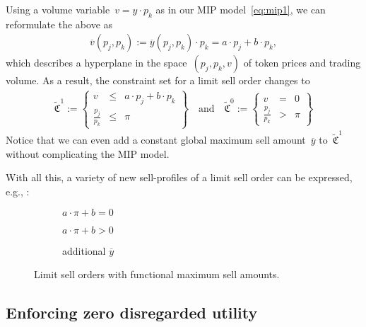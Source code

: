 \documentclass[11pt,parskip=full]{scrartcl}%
\newcommand*{\eg}{e.g., }
\begin{document}
Using a volume variable~$v = y \cdot p_k$ as in our MIP model~\eqref{eq:mip1}, we can reformulate
the above as
\begin{align}
  \overline{v}(p_j, p_k) := \overline{y}(p_j, p_k) \cdot p_k = a \cdot p_j + b \cdot p_k,
\end{align}
which describes a hyperplane in the space~$(p_j, p_k, v)$ of token prices and trading volume.
As a result, the constraint set for a limit sell order changes to
\begin{align}
  \tilde{\mathfrak{C}}^1 := \left\{
  \begin{array}{rlll}
    v &\le & a \cdot p_j + b \cdot p_k \\[1mm]
    \frac{p_j}{p_k} &\le & \pi
  \end{array}
  \right\}
  \quad
  \text{and}
  \quad
  \tilde{\mathfrak{C}}^0 := \left\{
  \begin{array}{rll}
    v &= & 0 \\[1mm]
    \frac{p_j}{p_k} &> & \pi
  \end{array}
  \right\}
  \label{eq:order_model_functional_sell_amount}
\end{align}
Notice that we can even add a constant global maximum sell amount~$\overline{y}$
to~$\tilde{\mathfrak{C}}^1$ without complicating the MIP model.

With all this, a variety of new sell-profiles of a limit sell order can be expressed, \eg:

\begin{figure}[h!]
  \begin{subfigure}{0.25\textwidth}
    
    \caption{$a \cdot \pi + b = 0$}
  \end{subfigure}
  \hfill
  \begin{subfigure}{0.25\textwidth}
    
    \caption{$a \cdot \pi + b > 0$}
  \end{subfigure}
  \hfill
  \begin{subfigure}{0.25\textwidth}
    
    \caption{additional $\overline{y}$}
  \end{subfigure}
  \caption{
    Limit sell orders with functional maximum sell amounts.
    }
  \label{fig:functional_sell_demand}
\end{figure}


\newpage
\subsection{Enforcing zero disregarded utility}
\end{document}
